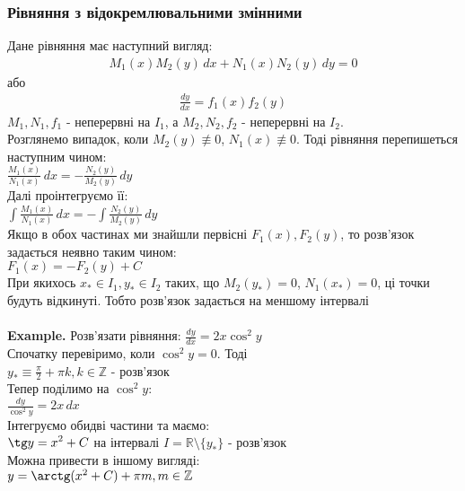 \documentclass[a4paper, 14pt]{extarticle}
\def\huge{\displaystyle}
\def\bigline{\vspace{5mm}\\}
\begin{document}
	\subsubsection{Рівняння з відокремлювальними змінними}
	Дане рівняння має наступний вигляд:
	\begin{align*}
	M_1(x)M_2(y)\,dx+N_1(x)N_2(y)\,dy=0
	\end{align*}
	або
	\begin{align*}
	\frac{dy}{dx} = f_1(x) f_2(y)
	\end{align*}
	$M_1, N_1, f_1$ - неперервні на $I_1$, а $M_2, N_2, f_2$ - неперервні на $I_2$.\\
	Розглянемо випадок, коли $M_2(y) \not\equiv 0$, $N_1(x) \not\equiv 0$. Тоді рівняння перепишеться наступним чином:\\
	$\huge \frac{M_1(x)}{N_1(x)}\,dx = -\frac{N_2(y)}{M_2(y)}\,dy$\\
	Далі проінтегруємо її:\\
	$\huge \int \frac{M_1(x)}{N_1(x)}\,dx = - \int \frac{N_2(y)}{M_2(y)}\,dy$\\
	Якщо в обох частинах ми знайшли первісні $F_1(x), F_2(y)$, то розв'язок задається неявно таким чином:\\
	$F_1(x)=-F_2(y)+C$\\
	При якихось $x_* \in I_1, y_* \in I_2$ таких, що $M_2(y_*) = 0$, $N_1(x_*)=0$, ці точки будуть відкинуті. Тобто розв'язок задається на меншому інтервалі\\
	\bigline
	\textbf{Example.} Розв'язати рівняння: $\huge \frac{dy}{dx}=2x \cos^2 y$\\
	Спочатку перевіримо, коли $\cos^2 y=0$. Тоді\\ $\huge y_* \equiv \frac{\pi}{2} + \pi k, k \in \mathbb{Z}$ - розв'язок\\
	Тепер поділимо на $\cos ^2 y$:\\
	$\huge \frac{dy}{\cos^2 y} = 2x\,dx$\\
	Інтегруємо обидві частини та маємо:\\
	$\huge \tg y = x^2 + C$ на інтервалі $I = \mathbb{R} \setminus \{y_*\}$ - розв'язок\\
	Можна привести в іншому вигляді:\\
	$y = \arctg (x^2+C) + \pi m, m \in \mathbb{Z}$
	
\end{document}
